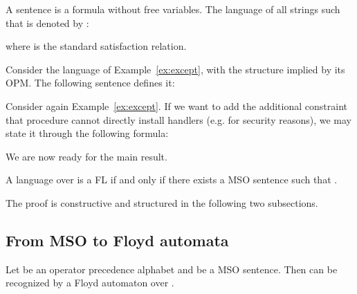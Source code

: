\documentclass[10pt,a4paper,runningheads]{llncs}
\begin{document}
A sentence is a formula without free variables.
The language of all strings  such that  is denoted by
:

where  is the standard satisfaction relation.


\begin{example}
\label{ex:ss}
Consider the language of Example~\ref{ex:except}, with the structure
implied by its OPM. 
The following sentence defines it:

\end{example}

\begin{example}
\label{ex:tt}
Consider again Example~\ref{ex:except}. If we want to add the
additional constraint that procedure  cannot directly install handlers
(e.g. for security reasons), we may state it through the following
formula:




\end{example}


We are now ready for the main result.

\begin{theorem}
\label{teo:logic}
A language  over  is a FL if and only if there exists a
MSO sentence  such that .
\end{theorem}
The proof is constructive and structured in the following two subsections.

\subsection{From MSO to Floyd automata}

\begin{proposition}
\label{teo:logic:f2a}
Let  be an operator precedence alphabet and   be a MSO
sentence. Then  can be recognized by a Floyd automaton over
.
\end{proposition}
\end{document}
